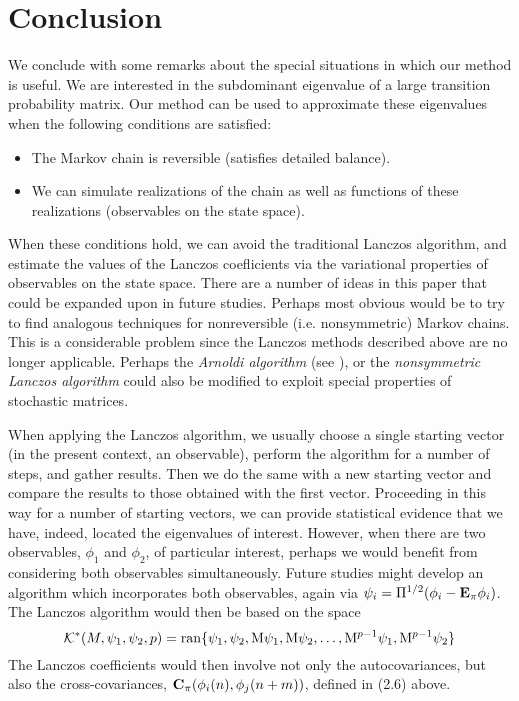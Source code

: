 \chapter{Conclusion}
\label{cha:conclusion}
We conclude with some remarks about the special situations in which our
method is useful.
We are interested in the subdominant eigenvalue of a large transition probability matrix. Our
method can be used to approximate these eigenvalues when the following conditions are satisfied:
\begin{itemize}
\item 
The Markov chain is reversible (satisfies detailed balance).
\item
We can simulate realizations of the chain as well as functions of these
realizations (observables on the state space).
\end{itemize}
When these conditions hold, we can avoid the traditional Lanczos algorithm, and
estimate the values of the Lanczos coeﬂicients via the variational properties of
observables on the state space. 
There are a number of ideas in this paper that could be expanded upon in future
studies.  Perhaps most obvious would be to try to find analogous techniques for
nonreversible (i.e. nonsymmetric) Markov chains. This is a considerable problem
since the Lanczos methods described above are no longer applicable. Perhaps the
\emph{Arnoldi algorithm} (see \cite[Algorithm 6.9]{Demmel:1997}), or the
\emph{nonsymmetric Lanczos algorithm} could also be modified to exploit
special properties of stochastic matrices. %
%
%
%
%

When applying the Lanczos algorithm, we usually choose a single starting vector (in the
present context, an observable), perform the algorithm for a number of steps, and gather results.
Then we do the same with a new starting vector and compare the results to those obtained with
the first vector. Proceeding in this way for a number of starting vectors, we can provide statistical
evidence that we have, indeed, located the eigenvalues of interest. However, when there are two
observables, $\phi_1$ and $\phi_2$, of particular interest, perhaps we would
benefit from considering both observables simultaneously. Future studies might
develop an algorithm which incorporates both observables, 
again via $\psi_i = \Pi^{1/2}(\phi_i - \mathbf{E}_{\pi}\phi_i)$. %
The Lanczos algorithm would then be based on the space 
\[
\mathcal{K}^*(M,\psi_1, \psi_2, p) =  \operatorname{ran}\{\psi_1, \psi_2, \mathrm{M}\psi_1, 
\mathrm{M}\psi_2, \dots, \mathrm{M}^{p-1}\psi_1, \mathrm{M}^{p-1}\psi_2\}
\]
The Lanczos coefficients would then involve not only the autocovariances,
but also the cross-covariances, 
$\mathbf{C}_\pi(\phi_i(n), \phi_j(n+m))$, defined in (2.6) above.
